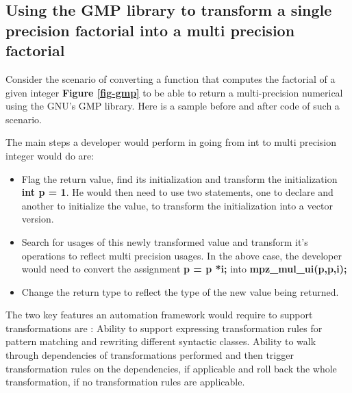 \documentclass[preprint]{sigplanconf}
\begin{document}
\subsection{Using the GMP library to transform a single precision factorial into a multi precision factorial}
Consider the scenario of converting a function that computes the factorial of a given integer \textbf{Figure \ref{fig-gmp}} to be able to return a multi-precision numerical using the GNU's GMP library. Here is a sample before and after code of such a scenario.
\begin{figure*}
\caption{Integer to BigInteger conversion using GMP}
\label{fig-gmp}
\end{figure*}
The main steps a developer would perform in going from int to multi precision integer would do are:
\begin{itemize}
\item Flag the return value, find its initialization and transform the initialization \textbf{int p = 1}. He would then need to use two statements, one to declare and another to initialize the value,  to transform the initialization into a vector version. 
\item Search for usages of this newly transformed value and transform it's operations to reflect multi precision usages. In the above case, the developer would need to convert the assignment \textbf{p = p *i;}  into \textbf{mpz\_mul\_ui(p,p,i);} 
\item Change the return type to reflect the type of the new value being returned.
\end{itemize}

The two key features an automation framework would require to support transformations are :
Ability to support expressing transformation rules for pattern matching and rewriting different syntactic classes. 
Ability to walk through dependencies of transformations performed and then trigger transformation rules on the dependencies, if applicable and roll back the whole transformation, if no transformation rules are applicable.
\end{document}
